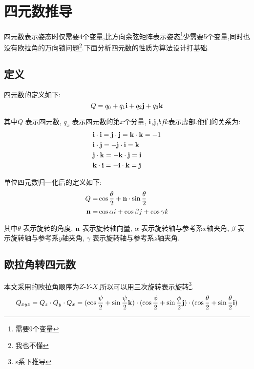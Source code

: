 
\section{四元数推导}
四元数表示姿态时仅需要4个变量,比方向余弦矩阵表示姿态\footnote{需要9个变量}少需要5个变量,同时也没有欧拉角的万向锁问题\footnote{我也不懂}.下面分析四元数的性质为算法设计打基础.

\subsection{定义}
四元数的定义如下:
\begin{equation}\label{四元数定义}
    Q = q_0 + q_1\mathbf{i} + q_2\mathbf{j} + q_3\mathbf{k}
\end{equation} 

其中$Q$     表示四元数,
$q_x$       表示四元数的第$x$个分量,
$\mathbf{i}$,$\mathbf{j}$,$bfk$表示虚部.他们的关系为:
\begin{equation}\label{四元数虚部关系}
    \begin{split}
        & \mathbf{i} \cdot \mathbf{i} =  \mathbf{j} \cdot \mathbf{j} = \mathbf{k} \cdot \mathbf{k} = -1 \\
        & \mathbf{i} \cdot \mathbf{j} = -\mathbf{j} \cdot \mathbf{i} = \mathbf{k} \\
        & \mathbf{j} \cdot \mathbf{k} = -\mathbf{k} \cdot \mathbf{j} = \mathbf{i} \\
        & \mathbf{k} \cdot \mathbf{i} = -\mathbf{i} \cdot \mathbf{k} = \mathbf{j}
    \end{split}
\end{equation} 

单位四元数{归一化后}的定义如下:
\begin{equation}\label{四元数归一化定义}
    \begin{split}
        Q = & \cos\frac{\theta}{2} + \mathbf{n} \cdot \sin\frac{\theta}{2} \\
        \mathbf{n} = & \cos{\alpha}i + \cos{\beta}j + \cos{\gamma}k
    \end{split}
\end{equation} 

其中$\theta$    表示旋转的角度,
$\mathbf{n}$       表示旋转轴向量,
$\alpha$        表示旋转轴与参考系$x$轴夹角,
$\beta$         表示旋转轴与参考系$y$轴夹角,
$\gamma$        表示旋转轴与参考系$z$轴夹角.

\subsection{欧拉角转四元数}
本文采用的欧拉角顺序为$Z$-$Y$-$X$,所以可以用三次旋转表示\cite{飞行器专题资料}旋转\footnote{s系下推导}.
\begin{equation}\label{四元数三次旋转}
    Q_{xyz} = Q_z \cdot Q_y \cdot Q_x = (\cos\frac{\psi}{2} + \sin\frac{\psi}{2} \mathbf{k}) \cdot (\cos\frac{\phi}{2} + \sin\frac{\phi}{2} \mathbf{j}) \cdot (\cos\frac{\theta}{2} + \sin\frac{\theta}{2} \mathbf{i})
\end{equation} 

